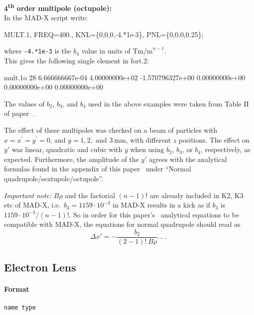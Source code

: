 \noindent\textbf{4\textsuperscript{th} order multipole (octupole):}\\
\noindent In  the MAD-X script write:
\begin{cverbatim}
MULT.1, FREQ=400., KNL=\{0,0,0,-4.*1e-3\}, PNL=\{0,0,0,0.25\};
\end{cverbatim}
where \texttt{-4.*1e-3} is the $b_4$ value in units of $\mathrm{Tm/m}^{n-1}$.\\
This gives the following single element in fort.2:
\begin{cverbatim}
mult.1o  28  6.666666667e-04  4.00000000e+02  -1.570796327e+00  0.00000000e+00  0.00000000e+00  0.00000000e+00
\end{cverbatim}

\bigskip
\noindent The values of $b_2$, $b_3$, and $b_4$ used in the above examples were taken from Table II of paper~\cite{RFmultsPaper}.

The effect of these multipoles was checked on a beam of particles with $x=x^{\prime}=y^{\prime}=0$, and $y= 1, 2, \text{ and } 3~\mathrm{mm}$, with different $z$ positions.
The effect on $y'$ was linear, quadratic and cubic with $y$ when using $b_2$, $b_3$, or $b_4$, respectively, as expected.
Furthermore, the amplitude of the $y'$ agrees with the analytical formulas found in the appendix of this paper~\cite{RFmultsPaper} under ``Normal quadrupole/sextupole/octupole''.

\textit{Important note:} $B\rho$ and the factorial $(n-1)!$ are already included in K2, K3 etc of MAD-X, i.e.\ $b_3=1159\cdot10^{-3}$ in MAD-X results in a kick as if $b_3$ is $1159\cdot10^{-3}/(n-1)!$.
So in order for this paper's~\cite{RFmultsPaper} analytical equations to be compatible with MAD-X, the equations for normal quadrupole should read as
\begin{equation*}
    \Delta x'=-\frac{b_2}{(2-1)! ~ B\rho} \ldots~.
\end{equation*}

\subsection{Electron Lens} \label{ELEN}

\paragraph{Format} \texttt{name type}

